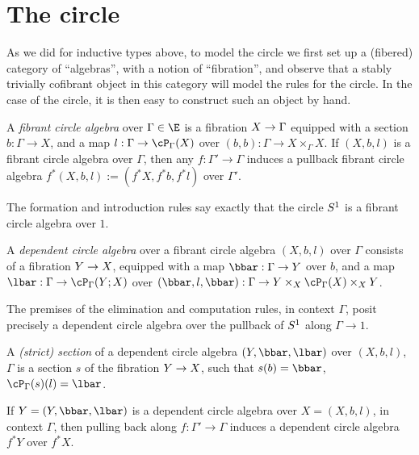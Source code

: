 \documentclass{amsart}
\begin{document}
\section{The circle}
\label{sec:circtype}


As we did for inductive types above, to model the circle we first set up a (fibered) category of “algebras”, with a notion of “fibration”, and observe that a stably trivially cofibrant object in this category will model the rules for the circle.
%
In the case of the circle, it is then easy to construct such an object by hand.

\begin{definition}
A \emph{fibrant circle algebra} over $\Gamma \in \E$ is a fibration $X \to \Gamma$ equipped with a section $b : \Gamma \to X$, and a map $l : \Gamma \to \paths[\Gamma]{X}$ over $(b,b) : \Gamma \to X \times_\Gamma X$.
%
If $(X,b,l)$ is a fibrant circle algebra over $\Gamma$, then any $f : \Gamma' \to \Gamma$ induces a pullback fibrant circle algebra $f^*(X,b,l) := (f^*X,f^*b,f^*l)$ over $\Gamma'$.
\end{definition}

The formation and introduction rules say exactly that the circle $S^1$ is a fibrant circle algebra over $1$.

\begin{definition}
A \emph{dependent circle algebra} over a fibrant circle algebra $(X,b,l)$ over $\Gamma$ consists of a fibration $Y \to X$, equipped with a map $\bbar : \Gamma \to Y$ over $b$, and a map $\lbar : \Gamma \to \pathsover[\Gamma]{X}{Y}$ over $(\bbar,l,\bbar) : \Gamma \to Y \times_X \paths[\Gamma]{X} \times_X Y$. 
\end{definition}

The premises of the elimination and computation rules, in context $\Gamma$, posit precisely a dependent circle algebra over the pullback of $S^1$ along $\Gamma \to 1$.

\begin{definition}
A \emph{(strict) section} of a dependent circle algebra $(Y,\bbar,\lbar)$ over $(X,b,l)$, $\Gamma$ is a section $s$ of the fibration $Y \to X$, such that $s(b) = \bbar$, $\paths[\Gamma]{s}(l) = \lbar$.

If $Y = (Y,\bbar,\lbar)$ is a dependent circle algebra over $X = (X,b,l)$, in context $\Gamma$, then pulling back along $f : \Gamma' \to \Gamma$ induces a dependent circle algebra $f^*Y$ over $f^*X$.
\end{definition}
\end{document}
